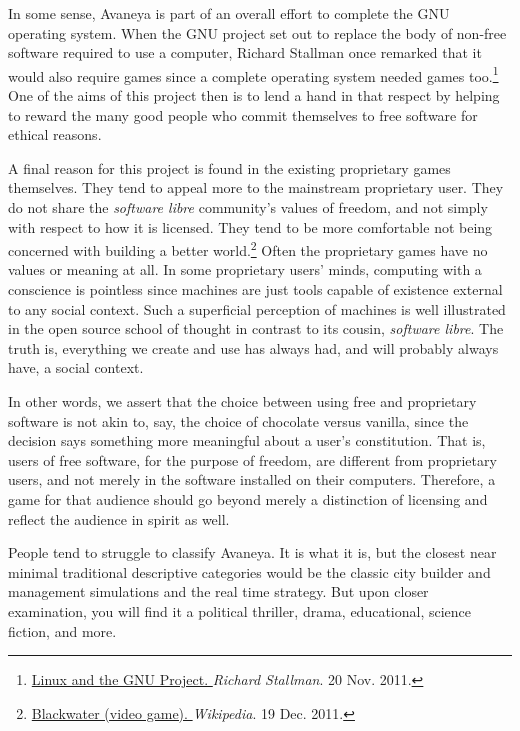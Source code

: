 In some sense, Avaneya is part of an overall effort to complete the GNU operating system. When the GNU project set out to replace the body of non-free software required to use a computer, Richard Stallman once remarked that it would also require games since a complete operating system needed games too.\footnote{\href{http://www.gnu.org/gnu/linux-and-gnu.html}{Linux and the GNU Project. }{\it Richard Stallman}. 20 Nov. 2011.} One of the aims of this project then is to lend a hand in that respect by helping to reward the many good people who commit themselves to free software for ethical reasons.

A final reason for this project is found in the existing proprietary games themselves. They tend to appeal more to the mainstream proprietary user. They do not share the {\it software libre} community's values of freedom, and not simply with respect to how it is licensed. They tend to be more comfortable not being concerned with building a better world.\footnote{\href{https://secure.wikimedia.org/wikipedia/en/wiki/Blackwater_\%28video_game\%29}{Blackwater (video game). }{\it Wikipedia}. 19 Dec. 2011.} Often the proprietary games have no values or meaning at all. In some proprietary users' minds, computing with a conscience is pointless since machines are just tools capable of existence external to any social context. Such a superficial perception of machines is well illustrated in the open source school of thought in contrast to its cousin, {\it software libre}. The truth is, everything we create and use has always had, and will probably always have, a social context.

In other words, we assert that the choice between using free and proprietary software is not akin to, say, the choice of chocolate versus vanilla, since the decision says something more meaningful about a user's constitution. That is, users of free software, for the purpose of freedom, are different from proprietary users, and not merely in the software installed on their computers. Therefore, a game for that audience should go beyond merely a distinction of licensing and reflect the audience in spirit as well.

People tend to struggle to classify Avaneya. It is what it is, but the closest near minimal traditional descriptive categories would be the classic city builder and management simulations and the real time strategy. But upon closer examination, you will find it a political thriller, drama, educational, science fiction, and more.

